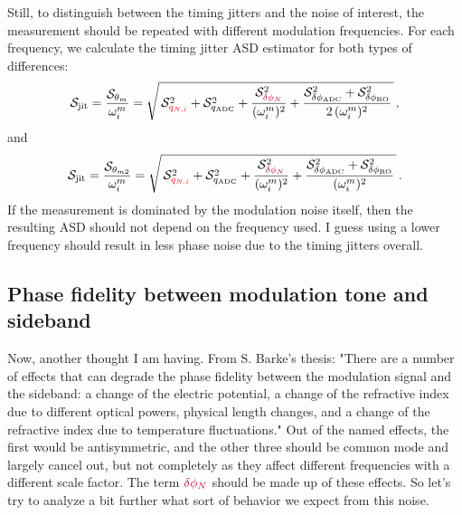 \documentclass[11pt]{article}
\begin{document}
Still, to distinguish between the timing jitters and the noise of interest, the measurement should be repeated with different modulation frequencies. For each frequency, we calculate the timing jitter ASD estimator for both types of differences:
\begin{equation*}
    \mathcal{S}_{\text{jit}}
    = \frac{\mathcal{S}_{\theta_m}}{\omega_i^{m}}
    = \sqrt{\,\mathcal{S}_{{\color{red}q_{N,i}}}^{2} + \mathcal{S}_{q_{\text{ADC}}}^{2}
      + \frac{\mathcal{S}_{{\color{purple}\delta\phi_{N}}}^{2}}{(\omega_i^{m})^{2}}
      + \frac{\mathcal{S}_{\delta\phi_{\text{ADC}}}^{2}
      + \mathcal{S}_{\delta\phi_{\text{RO}}}^{2}}{2\,(\omega_i^{m})^{2}}\,}\,,
\end{equation*}
and
\begin{equation*}
    \mathcal{S}_{\text{jit}}
    = \frac{\mathcal{S}_{\theta_{m2}}}{\omega_i^{m}}
    = \sqrt{\,\mathcal{S}_{{\color{red}q_{N,i}}}^{2} + \mathcal{S}_{q_{\text{ADC}}}^{2}
      + \frac{\mathcal{S}_{{\color{purple}\delta\phi_{N}}}^{2}}{(\omega_i^{m})^{2}}
      + \frac{\mathcal{S}_{\delta\phi_{\text{ADC}}}^{2}
      + \mathcal{S}_{\delta\phi_{\text{RO}}}^{2}}{(\omega_i^{m})^{2}}\,}\,.
\end{equation*}
If the measurement is dominated by the modulation noise itself, then the resulting ASD should not depend on the frequency used. I guess using a lower frequency should result in less phase noise due to the timing jitters overall.


\subsection*{Phase fidelity between modulation tone and sideband}


Now, another thought I am having. From S. Barke's thesis: "There are a number of effects that can degrade the phase fidelity between the modulation signal and the sideband: a change of the electric potential, a change of the refractive index due to different optical powers, physical length changes, and a change of the refractive index due to temperature fluctuations." Out of the named effects, the first would be antisymmetric, and the other three should be common mode and largely cancel out, but not completely as they affect different frequencies with a different scale factor. The term ${\color{purple}\delta\phi_{N}}$ should be made up of these effects. So let's try to analyze a bit further what sort of behavior we expect from this noise.
\end{document}
